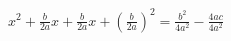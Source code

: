 \documentclass[preview]{standalone}
\begin{document}
\begin{align*}
{x}^{2} + \frac{b}{2 a} x + \frac{b}{2 a} x + {\left( \frac{b}{2 a} \right)}^{2} = \frac{{b}^{2}}{4 {a}^{2}} - \frac{4 a c}{4 {a}^{2}}
\end{align*}
\end{document}
